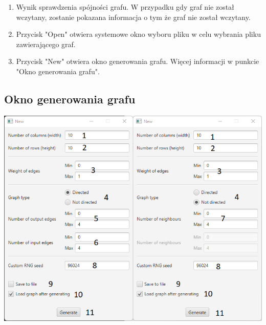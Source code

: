 \documentclass[11pt,a4paper]{report}
\begin{document}
    \begin{enumerate}
        \item Wynik sprawdzenia spójności grafu. W przypadku gdy graf nie został wczytany, zostanie pokazana informacja o tym że graf nie został wczytany.
        \item Przycisk "Open" otwiera systemowe okno wyboru pliku w celu wybrania pliku zawierającego graf.
        \item Przycisk "New" otwiera okno generowania grafu. Więcej informacji w punkcie "Okno generowania grafu".
    \end{enumerate}

    \subsection{Okno generowania grafu}

    \includegraphics[width=\textwidth]{view2.png}
\end{document}
